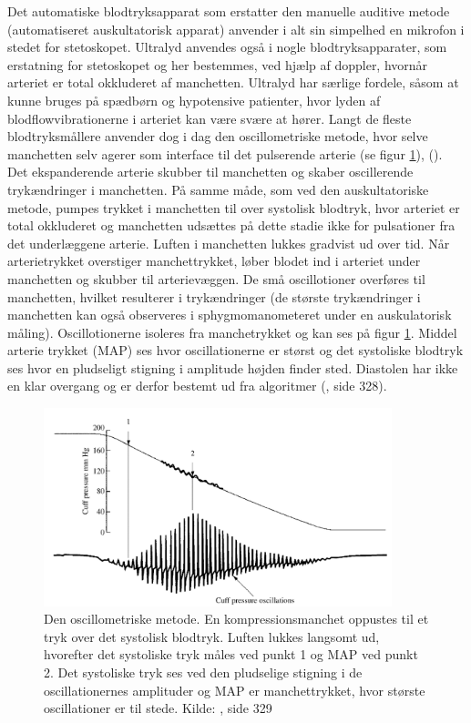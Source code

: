 Det automatiske blodtryksapparat som erstatter den manuelle auditive metode (automatiseret auskultatorisk apparat) anvender i alt sin simpelhed en mikrofon i stedet for stetoskopet. Ultralyd anvendes også i nogle blodtryksapparater, som erstatning for stetoskopet og her bestemmes, ved hjælp af doppler, hvornår arteriet er total okkluderet af manchetten. Ultralyd har særlige fordele, såsom at kunne bruges på spædbørn og hypotensive patienter, hvor lyden af blodflowvibrationerne i arteriet kan være svære at hører. Langt de fleste blodtryksmållere anvender dog i dag den oscillometriske metode, hvor selve manchetten selv agerer som interface til det pulserende arterie (se figur \ref{fig:OscillometriskMetode}), (\cite{RefWorks:24}). Det ekspanderende arterie skubber til manchetten og skaber oscillerende trykændringer i manchetten. På samme måde, som ved den auskultatoriske metode, pumpes trykket i manchetten til over systolisk blodtryk, hvor arteriet er total okkluderet og manchetten udsættes på dette stadie ikke for pulsationer fra det underlæggene arterie. Luften i manchetten lukkes gradvist ud over tid. Når arterietrykket overstiger manchettrykket, løber blodet ind i arteriet under manchetten og skubber til arterievæggen. De små oscillotioner overføres til manchetten, hvilket resulterer i trykændringer (de største trykændringer i manchetten kan også observeres i sphygmomanometeret under en auskulatorisk måling). Oscillotionerne isoleres fra manchetrykket og kan ses på figur \ref{fig:OscillometriskMetode}. Middel arterie trykket (MAP) ses hvor oscillationerne er størst og det systoliske blodtryk ses hvor en pludseligt stigning i amplitude højden finder sted. Diastolen har ikke en klar overgang og er derfor bestemt ud fra algoritmer (\cite{RefWorks:27}, side 328).

\begin{figure}[H]
	\centering
	\includegraphics[width=0.9\textwidth]{billeder/OscillometriskMetode.png}
	\caption{Den oscillometriske metode. En kompressionsmanchet oppustes til et tryk over det systolisk blodtryk. Luften lukkes langsomt ud, hvorefter det systoliske tryk måles ved punkt 1 og MAP ved punkt 2. Det systoliske tryk ses ved den pludselige stigning i de oscillationernes amplituder og MAP er manchettrykket, hvor største oscillationer er til stede. Kilde: \cite{RefWorks:27}, side 329} \label{fig:OscillometriskMetode}
\end{figure}

